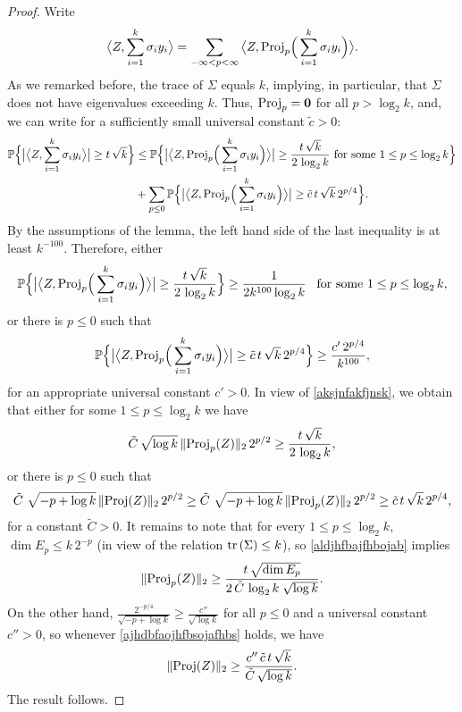 \documentclass[11pt]{amsart}
\theoremstyle{definition}
\theoremstyle{plain}
\def\Prob{{\mathbb P}}
\def\Prob{{\mathbb P}}
\def\Proj{{\rm Proj}}
\begin{document}
\begin{proof}
Write
$$
\big\langle Z,\sum_{i=1}^k \sigma_i y_i\big\rangle
=
\sum\limits_{-\infty< p< \infty}
\big\langle Z,\Proj_p\Big(\sum_{i=1}^k \sigma_i y_i\Big)\big\rangle.
$$
As we remarked before,
the trace of $\Sigma$ equals $k$, implying, in particular,
that $\Sigma$ does not have eigenvalues exceeding $k$.
Thus, $\Proj_p={\bf 0}$ for all $p>\log_2 k$,
and, we can write for a sufficiently small universal constant 
$\tilde c>0$:
\begin{align*}
\Prob
\Big\{
\big|\big\langle Z,\sum_{i=1}^k \sigma_i y_i\big\rangle\big|
\geq t\,\sqrt{k}
\Big\}
&\leq 
\Prob
\Big\{
\big|\big\langle Z,\Proj_p\Big(\sum_{i=1}^k \sigma_i y_i\Big)
\big\rangle\big|
\geq \frac{t\,\sqrt{k}}{2\,\log_2 k}
\mbox{ for some $1\leq p\leq \log_2 k$}
\Big\}\\
&+\sum\limits_{p\leq 0}
\Prob
\Big\{
\big|\big\langle Z,\Proj_p\Big(\sum_{i=1}^k \sigma_i y_i\Big)
\big\rangle\big|
\geq \tilde c\,t\,\sqrt{k}\,2^{p/4}
\Big\}.
\end{align*}
By the assumptions of the lemma,
the left hand side of the last inequality is at least $k^{-100}$.
Therefore, either
$$
\Prob
\Big\{
\big|\big\langle Z,\Proj_p\Big(\sum_{i=1}^k \sigma_i y_i\Big)
\big\rangle\big|
\geq \frac{t\,\sqrt{k}}{2\,\log_2 k}\Big\}
\geq \frac{1}{2k^{100}\log_2 k}\;\;\;
\mbox{for some $1\leq p\leq \log_2 k$},
$$
or there is $p\leq 0$ such that
$$
\Prob
\Big\{
\big|\big\langle Z,\Proj_p\Big(\sum_{i=1}^k \sigma_i y_i\Big)
\big\rangle\big|
\geq \tilde c\,t\,\sqrt{k}\,2^{p/4}
\Big\}\geq \frac{c'\,2^{p/4}}{k^{100}},
$$
for an appropriate universal constant $c'>0$.
In view of \eqref{aksjnfakfjnsk}, we obtain that
either for some $1\leq p\leq \log_2 k$ we have
\begin{equation}\label{aldjhfbajfhbojab}
\tilde C\,\sqrt{\log k}\,
\|\Proj_p(Z)\|_2\,2^{p/2}\geq 
\frac{t\,\sqrt{k}}{2\,\log_2 k},
\end{equation}
or there is $p\leq 0$ such that
\begin{equation}\label{ajhdbfaojhfbsojafhbs}
\tilde C\,\,\sqrt{-p+\log k}\,
\|\Proj(Z)\|_2\,2^{p/2}\geq
\tilde C\,\,\sqrt{-p+\log k}\,
\|\Proj_p(Z)\|_2\,2^{p/2}\geq
\tilde c\,t\,\sqrt{k}\,2^{p/4},
\end{equation}
for a constant $\tilde C>0$.
It remains to note that for every $1\leq p\leq \log_2 k$,
$\dim E_p\leq k\,2^{-p}$ (in view of the relation
${\rm tr}\,(\Sigma)\leq k$), so \eqref{aldjhfbajfhbojab}
implies
$$
\|\Proj_p(Z)\|_2\geq 
\frac{t\,\sqrt{\dim E_p}}{2\,\tilde C\,\log_2 k\;\sqrt{\log k}}.
$$
On the other hand, $\frac{2^{-p/4}}{\sqrt{-p+\log k}}
\geq \frac{c''}{\sqrt{\log k}}$ for all $p\leq 0$
and a universal constant $c''>0$,
so whenever \eqref{ajhdbfaojhfbsojafhbs} holds,
we have
$$
\|\Proj(Z)\|_2\geq
\frac{c''\,\tilde c\,t\,\sqrt{k}}{\tilde C\,\sqrt{\log k}}.
$$
The result follows.
\end{proof}
\end{document}
